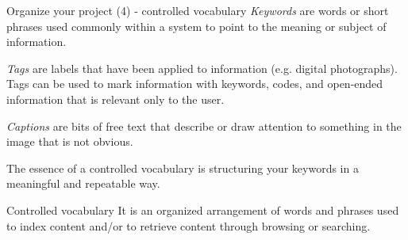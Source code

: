 \documentclass[10pt,aspectratio=169,notes]{beamer} %
\begin{document}
\begin{frame}[t,label=frame12]{Organize your project (4) - controlled vocabulary}
\emph{Keywords} are words or short phrases used commonly within a system to point to the meaning or subject of information.

\emph{Tags} are labels that have been applied to information (e.g. digital photographs). 
Tags can be used to mark information with keywords, codes, and open-ended information that is relevant only to the user.

\emph{Captions} are bits of free text that describe or draw attention to something in the image that is not obvious.

The essence of a \alert{controlled vocabulary} is structuring your keywords in a meaningful and repeatable way.

\begin{alertblock}{Controlled vocabulary}
It is an organized arrangement of words and phrases used to index content and/or to retrieve content through
browsing or searching.
\end{alertblock}
\end{frame}
\end{document}
